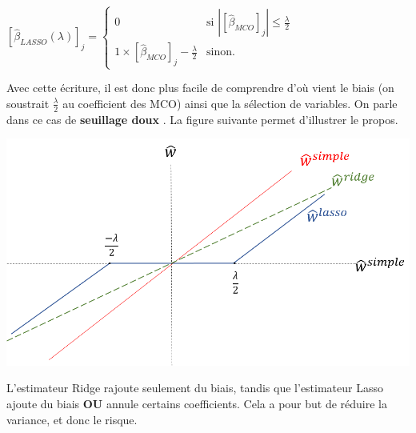 \documentclass[14pt, openany]{article}
\begin{document}
\begin{center}
$[\hat{\beta}_{LASSO}(\lambda)]_j = \left\{
    \begin{array}{ll}
        0 & \mbox{si } |[\hat{\beta}_{MCO}]_j|\leq \frac{\lambda}{2} \\
        1\times[\hat{\beta}_{MCO}]_{j}-\frac{\lambda}{2} & \mbox{sinon.}
    \end{array}
\right.$
\end{center}
Avec cette écriture, il est donc plus facile de comprendre d'où vient le biais (on soustrait $\frac{\lambda}{2}$ au coefficient des MCO) ainsi que la sélection de variables. On parle dans ce cas de \og \textbf{seuillage doux} \fg{}. La figure suivante permet d'illustrer le propos.
\begin{center}
\includegraphics[width=18cm]{Images/shrinkage.png}
\end{center}
L'estimateur Ridge rajoute seulement du biais, tandis que l'estimateur Lasso ajoute du biais \textbf{OU} annule certains coefficients. Cela a pour but de réduire la variance, et donc le risque.
\end{document}
